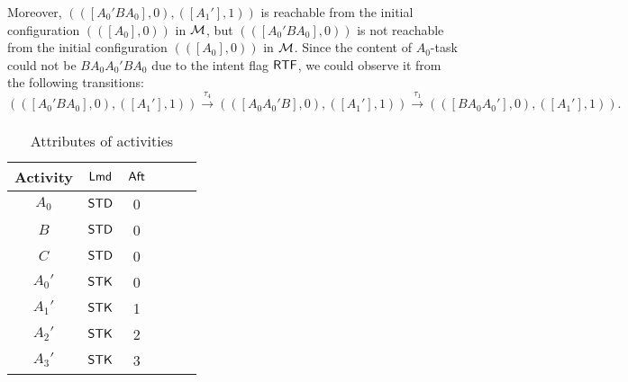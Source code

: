{\begin{example}
Moreover, $(([A_0'BA_0],0),([A_1'],1))$ is reachable from the initial configuration $(([A_0],0))$ in ${\mathcal{M} }$, but $(([A_0'BA_0],0))$ is not reachable from the initial configuration $(([A_0],0))$ in ${\mathcal{M} }$. Since the content of $A_0$-task could not be $BA_0A_0'BA_0$ due to the intent flag ${\sf RTF}$, we could observe it from the following transitions:
$$(([A_0'BA_0],0),([A_1'],1))\xrightarrow[]{\tau_4}(([A_0A_0'B],0),([A_1'],1))\xrightarrow[]{\tau_1}(([BA_0A_0'],0),([A_1'],1)).$$
\begin{table}[htbp]
	\begin{center}
	\begin{tabular}{|c|c|c|c|c|c|}
	\hline
	Activity & ${\sf Lmd}$ & ${\sf Aft}$\\
	\hline
	$A_0$ & $\mathsf{STD}$ & 0\\
	\hline
	$B$ & $\mathsf{STD}$ & 0 \\
	\hline
	$C$ & $\mathsf{STD}$ & 0 \\
	\hline
	$A_0'$ & $\mathsf{STK}$ & 0 \\
	\hline
	$A_1'$ & $\mathsf{STK}$ & 1 \\
	\hline
	$A_2'$ & $\mathsf{STK}$ & 2 \\
	\hline
	$A_3'$ & $\mathsf{STK}$ & 3 \\
	\hline
	\end{tabular}
	\caption{Attributes of activities}
	\label{tab-attribute-nostk}
	\end{center}
\end{table}
\end{example}
}

